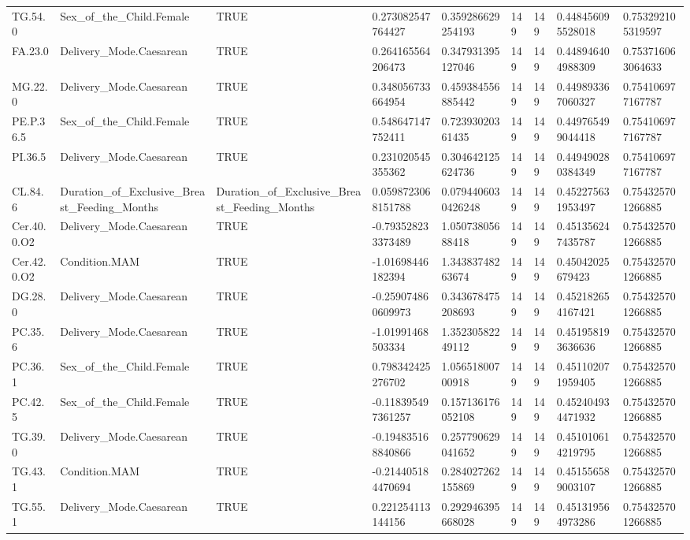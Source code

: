 \begin{longtable}{lllllllll}
TG.54.0 & Sex\_of\_the\_Child.Female & TRUE & 0.273082547764427 & 0.359286629254193 & 149 & 149 & 0.448456095528018 & 0.753292105319597 \\
FA.23.0 & Delivery\_Mode.Caesarean & TRUE & 0.264165564206473 & 0.347931395127046 & 149 & 149 & 0.448946404988309 & 0.753716063064633 \\
MG.22.0 & Delivery\_Mode.Caesarean & TRUE & 0.348056733664954 & 0.459384556885442 & 149 & 149 & 0.449893367060327 & 0.754106977167787 \\
PE.P.36.5 & Sex\_of\_the\_Child.Female & TRUE & 0.548647147752411 & 0.72393020361435 & 149 & 149 & 0.449765499044418 & 0.754106977167787 \\
PI.36.5 & Delivery\_Mode.Caesarean & TRUE & 0.231020545355362 & 0.304642125624736 & 149 & 149 & 0.449490280384349 & 0.754106977167787 \\
CL.84.6 & Duration\_of\_Exclusive\_Breast\_Feeding\_Months & Duration\_of\_Exclusive\_Breast\_Feeding\_Months & 0.0598723068151788 & 0.0794406030426248 & 149 & 149 & 0.452275631953497 & 0.754325701266885 \\
Cer.40.0.O2 & Delivery\_Mode.Caesarean & TRUE & -0.793528233373489 & 1.05073805688418 & 149 & 149 & 0.451356247435787 & 0.754325701266885 \\
Cer.42.0.O2 & Condition.MAM & TRUE & -1.01698446182394 & 1.34383748263674 & 149 & 149 & 0.45042025679423 & 0.754325701266885 \\
DG.28.0 & Delivery\_Mode.Caesarean & TRUE & -0.259074860609973 & 0.343678475208693 & 149 & 149 & 0.452182654167421 & 0.754325701266885 \\
PC.35.6 & Delivery\_Mode.Caesarean & TRUE & -1.01991468503334 & 1.35230582249112 & 149 & 149 & 0.451958193636636 & 0.754325701266885 \\
PC.36.1 & Sex\_of\_the\_Child.Female & TRUE & 0.798342425276702 & 1.05651800700918 & 149 & 149 & 0.451102071959405 & 0.754325701266885 \\
PC.42.5 & Sex\_of\_the\_Child.Female & TRUE & -0.118395497361257 & 0.157136176052108 & 149 & 149 & 0.452404934471932 & 0.754325701266885 \\
TG.39.0 & Delivery\_Mode.Caesarean & TRUE & -0.194835168840866 & 0.257790629041652 & 149 & 149 & 0.451010614219795 & 0.754325701266885 \\
TG.43.1 & Condition.MAM & TRUE & -0.214405184470694 & 0.284027262155869 & 149 & 149 & 0.451556589003107 & 0.754325701266885 \\
TG.55.1 & Delivery\_Mode.Caesarean & TRUE & 0.221254113144156 & 0.292946395668028 & 149 & 149 & 0.451319564973286 & 0.754325701266885 \\

\end{longtable}
